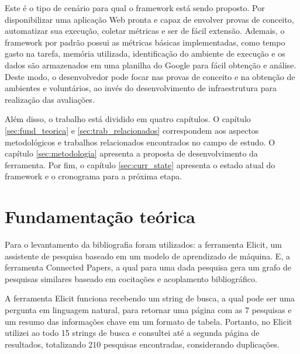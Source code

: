 \documentclass[12pt]{tcc}
\begin{document}
Este é o tipo de cenário para qual o framework está sendo proposto.
Por disponibilizar uma aplicação Web pronta e capaz de envolver provas de conceito, automatizar sua execução, coletar métricas e ser de fácil extensão.
Ademais, o framework por padrão possui as métricas básicas implementadas, como tempo gasto na tarefa, memória utilizada, identificação do ambiente de execução e os dados são armazenados em uma planilha do Google para fácil obtenção e análise.
Deste modo, o desenvolvedor pode focar nas provas de conceito e na obtenção de ambientes e voluntários, ao invés do desenvolvimento de infraestrutura para realização das avaliações.

Além disso, o trabalho está dividido em quatro capítulos.
O capítulo \ref{sec:fund_teorica} e \ref{sec:trab_relacionados} correspondem aos aspectos metodológicos e trabalhos relacionados encontrados no campo de estudo.
O capítulo \ref{sec:metodologia} apresenta a proposta de desenvolvimento da ferramenta.
Por fim, o capítulo \ref{sec:curr_state} apresenta o estado atual do framework e o cronograma para a próxima etapa.


\chapter{Fundamentação teórica}
\label{sec:background}
	\label{sec:fund_teorica}

Para o levantamento da bibliografia foram utilizados: 
a ferramenta Elicit, um assistente de pesquisa baseado em um modelo  de aprendizado de máquina.
E, a ferramenta Connected Papers, a qual para uma dada pesquisa gera um grafo de pesquisas similares baseado em cocitações e acoplamento bibliográfico.

A ferramenta Elicit funciona recebendo um string de busca, a qual pode ser uma pergunta em linguagem natural, para retornar uma página com as 7 pesquisas e um resumo das informações chave em um formato de tabela.
Portanto, no Elicit utilizei ao todo 15 strings de busca e consultei até a segunda página de resultados, totalizando 210 pesquisas encontradas, considerando duplicações.
\end{document}
